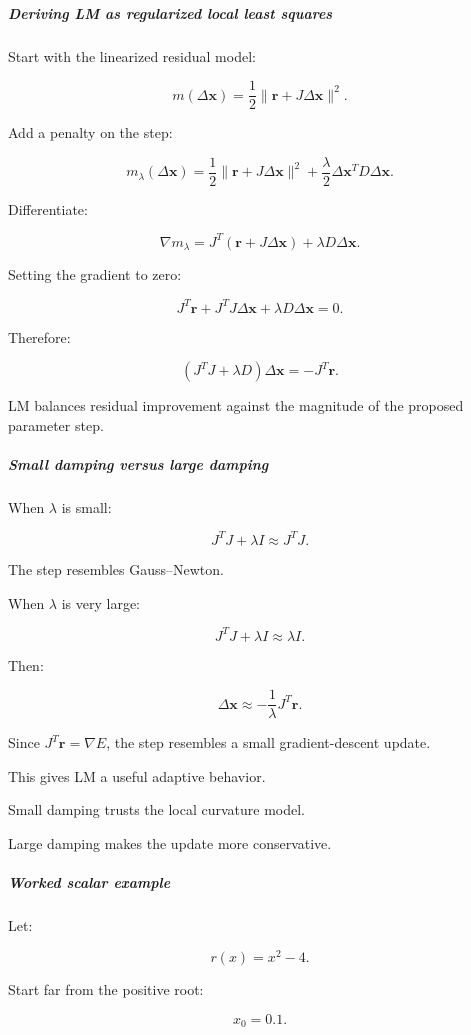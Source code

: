 \subparagraph{Deriving LM as regularized local least squares}\label{deriving-lm-as-regularized-local-least-squares}

Start with the linearized residual model:

\[
m(\Delta\mathbf x) = \frac12\|\mathbf r+J\Delta\mathbf x\|^2.
\]

Add a penalty on the step:

\[
m_\lambda(\Delta\mathbf x) = \frac12\|\mathbf r+J\Delta\mathbf x\|^2 +\frac\lambda2\Delta\mathbf x^TD\Delta\mathbf x.
\]

Differentiate:

\[
\nabla m_\lambda= J^T(\mathbf r+J\Delta\mathbf x) +\lambda D\Delta\mathbf x.
\]

Setting the gradient to zero:

\[
J^T\mathbf r+ J^TJ\Delta\mathbf x+ \lambda D\Delta\mathbf x=0.
\]

Therefore:

\[
\boxed{ (J^TJ+\lambda D)\Delta\mathbf x=-J^T\mathbf r }.
\]

LM balances residual improvement against the magnitude of the proposed parameter step.

\subparagraph{Small damping versus large damping}\label{small-damping-versus-large-damping}

When \(\lambda\) is small:

\[
J^TJ+\lambda I\approx J^TJ.
\]

The step resembles Gauss--Newton.

When \(\lambda\) is very large:

\[
J^TJ+\lambda I\approx\lambda I.
\]

Then:

\[
\Delta\mathbf x\approx-\frac1\lambda J^T\mathbf r.
\]

Since \(J^T\mathbf r=\nabla E\), the step resembles a small gradient-descent update.

This gives LM a useful adaptive behavior.

Small damping trusts the local curvature model.

Large damping makes the update more conservative.

\subparagraph{Worked scalar example}\label{worked-scalar-example}

Let:

\[
r(x)=x^2-4.
\]

Start far from the positive root:

\[
x_0=0.1.
\]

